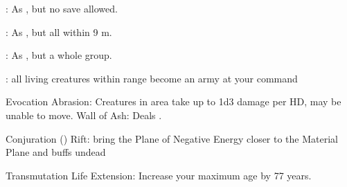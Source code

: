 : As , but no save allowed.

: As , but all within 9 m.

: As , but a whole group.

: all living creatures within range become an army at your command


Evocation
Abrasion: Creatures in area take up to 1d3 damage per HD, may be unable to move.
Wall of Ash: Deals .

Conjuration ()
Rift: bring the Plane of Negative Energy closer to the Material Plane and buffs undead

Transmutation
Life Extension: Increase your maximum age by 77 years.

